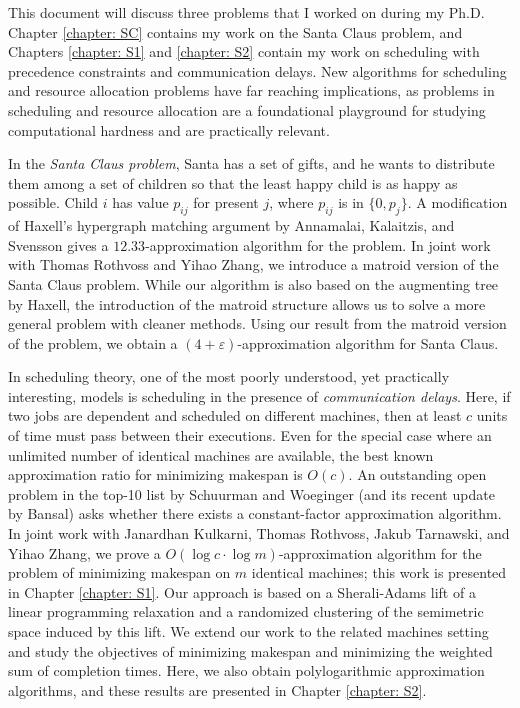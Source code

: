 This document will discuss three problems that I worked on during my Ph.D. 
Chapter \ref{chapter: SC} contains my work on the Santa Claus problem, and
Chapters \ref{chapter: S1} and \ref{chapter: S2} contain my work on scheduling with precedence constraints and communication delays.
New algorithms for scheduling and resource allocation problems have far reaching implications, as problems in scheduling and resource allocation
are a foundational playground for studying computational hardness and are practically relevant.

In the \emph{Santa Claus problem}, Santa has a set of gifts, and he wants to distribute them among a set of children
so that the least happy child is as happy as possible. 
Child $i$ has value $p_{ij}$ for present $j$, where $p_{ij}$ is in $ \{ 0,p_j\}$.
A modification of Haxell's hypergraph matching argument by Annamalai, Kalaitzis, and Svensson gives a $12.33$-approximation algorithm for the problem.
In joint work with Thomas Rothvoss and Yihao Zhang, we introduce a matroid version of the Santa Claus problem. 
While our algorithm is also based on the augmenting tree by Haxell, the introduction
of the matroid structure allows us to solve a more general problem with cleaner methods.
Using our result from the matroid version of the problem, we obtain a $(4+\varepsilon)$-approximation algorithm for Santa Claus.

In scheduling theory, one of the most poorly understood, yet practically interesting, models is scheduling
in the presence of \emph{communication delays}.
Here,
if two jobs are dependent and scheduled on different machines,
then at least $c$ units of time must pass between their executions.
Even for the special case where an unlimited number of identical machines are available, the best known approximation ratio
for minimizing makespan is $O(c)$.
An outstanding open problem in the top-10 list by Schuurman and Woeginger (and its recent update by Bansal)
asks whether there exists a constant-factor approximation algorithm.
In joint work with Janardhan Kulkarni, Thomas Rothvoss, Jakub Tarnawski, and Yihao Zhang,
 we prove a $O(\log c \cdot \log m)$-approximation algorithm
for the problem of minimizing makespan
on $m$ identical machines; this work is presented in Chapter \ref{chapter: S1}.
Our approach is based on a Sherali-Adams lift of a linear programming relaxation
and a randomized clustering of the semimetric space induced by this lift. 
We extend our work to the related machines setting and study the objectives of minimizing makespan 
and minimizing the weighted sum of completion times. 
Here, we also obtain polylogarithmic approximation algorithms, and these results are presented in Chapter \ref{chapter: S2}.